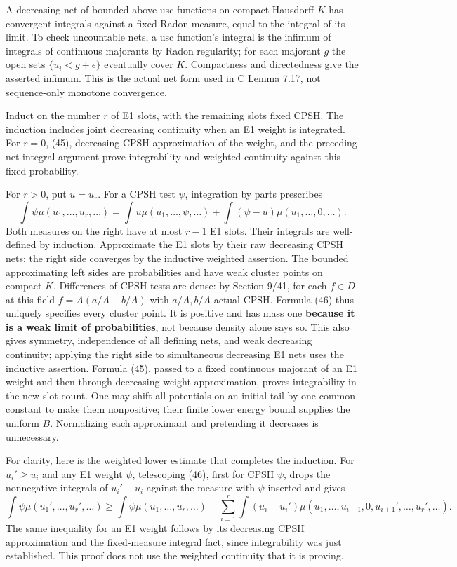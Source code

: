 \documentclass[
  10pt,
]{article}
\begin{document}
A decreasing net of bounded-above usc functions on compact Hausdorff
\(K\) has convergent integrals against a fixed Radon measure, equal to
the integral of its limit. To check uncountable nets, a usc function's
integral is the infimum of integrals of continuous majorants by Radon
regularity; for each majorant \(g\) the open sets \(\{u_i<g+\epsilon\}\)
eventually cover \(K\). Compactness and directedness give the asserted
infimum. This is the actual net form used in C Lemma 7.17, not
sequence-only monotone convergence.

Induct on the number \(r\) of E1 slots, with the remaining slots fixed
CPSH. The induction includes joint decreasing continuity when an E1
weight is integrated. For \(r=0\), (45), decreasing CPSH approximation
of the weight, and the preceding net integral argument prove
integrability and weighted continuity against this fixed probability.

For \(r>0\), put \(u=u_r\). For a CPSH test \(\psi\), integration by
parts prescribes \[
 \int\psi\mu(u_1,\ldots,u_r,\ldots)
 =\int u\mu(u_1,\ldots,\psi,\ldots)
  +\int(\psi-u)\mu(u_1,\ldots,0,\ldots).                                                     \tag{46}
\] Both measures on the right have at most \(r-1\) E1 slots. Their
integrals are well-defined by induction. Approximate the E1 slots by
their raw decreasing CPSH nets; the right side converges by the
inductive weighted assertion. The bounded approximating left sides are
probabilities and have weak cluster points on compact \(K\). Differences
of CPSH tests are dense: by Section 9/41, for each \(f\in D\) at this
field \(f=A(a/A-b/A)\) with \(a/A,b/A\) actual CPSH. Formula (46) thus
uniquely specifies every cluster point. It is positive and has mass one
\textbf{because it is a weak limit of probabilities}, not because
density alone says so. This also gives symmetry, independence of all
defining nets, and weak decreasing continuity; applying the right side
to simultaneous decreasing E1 nets uses the inductive assertion. Formula
(45), passed to a fixed continuous majorant of an E1 weight and then
through decreasing weight approximation, proves integrability in the new
slot count. One may shift all potentials on an initial tail by one
common constant to make them nonpositive; their finite lower energy
bound supplies the uniform \(B\). Normalizing each approximant and
pretending it decreases is unnecessary.

For clarity, here is the weighted lower estimate that completes the
induction. For \(u_i'\geq u_i\) and any E1 weight \(\psi\), telescoping
(46), first for CPSH \(\psi\), drops the nonnegative integrals of
\(u_i'-u_i\) against the measure with \(\psi\) inserted and gives \[
 \int\psi\mu(u_1',\ldots,u_r',\ldots)
 \geq\int\psi\mu(u_1,\ldots,u_r,\ldots)
  +\sum_{i=1}^r\int(u_i-u_i')\mu(u_1,\ldots,u_{i-1},0,u_{i+1}',\ldots,u_r',\ldots).               \tag{47}
\] The same inequality for an E1 weight follows by its decreasing CPSH
approximation and the fixed-measure integral fact, since integrability
was just established. This proof does not use the weighted continuity
that it is proving.
\end{document}
